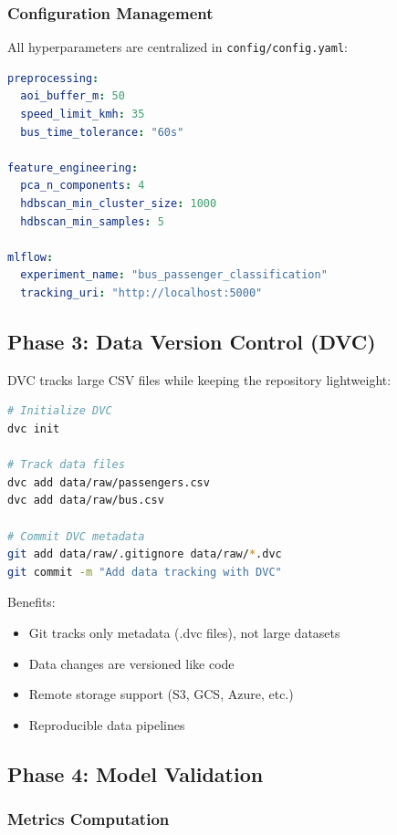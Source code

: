 \subsubsection{Configuration Management}

All hyperparameters are centralized in \texttt{config/config.yaml}:

\begin{lstlisting}[language=yaml, caption=Configuration File]
preprocessing:
  aoi_buffer_m: 50
  speed_limit_kmh: 35
  bus_time_tolerance: "60s"

feature_engineering:
  pca_n_components: 4
  hdbscan_min_cluster_size: 1000
  hdbscan_min_samples: 5

mlflow:
  experiment_name: "bus_passenger_classification"
  tracking_uri: "http://localhost:5000"
\end{lstlisting}

\subsection{Phase 3: Data Version Control (DVC)}

DVC tracks large CSV files while keeping the repository lightweight:

\begin{lstlisting}[language=bash, caption=DVC Initialization]
# Initialize DVC
dvc init

# Track data files
dvc add data/raw/passengers.csv
dvc add data/raw/bus.csv

# Commit DVC metadata
git add data/raw/.gitignore data/raw/*.dvc
git commit -m "Add data tracking with DVC"
\end{lstlisting}

Benefits:
\begin{itemize}
    \item Git tracks only metadata (.dvc files), not large datasets
    \item Data changes are versioned like code
    \item Remote storage support (S3, GCS, Azure, etc.)
    \item Reproducible data pipelines
\end{itemize}

\subsection{Phase 4: Model Validation}

\subsubsection{Metrics Computation}

